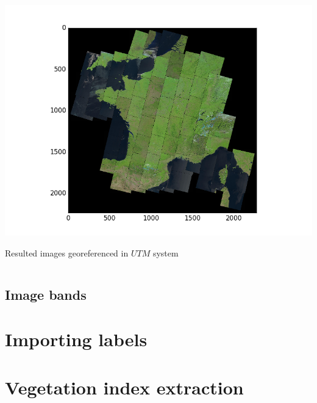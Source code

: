 \documentclass[c]{beamer}
\begin{document}
\begin{frame}
\begin{columns}[t]
\begin{column}{0.50\textwidth}
\begin{overlayarea}{\linewidth}{4cm}
  \centering\vfill
  \includegraphics[scale=0.25]{images/importing/france-covering.png}
\end{overlayarea}
\begin{overlayarea}{\linewidth}{1cm}
  \centering
  \scriptsize Resulted images georeferenced in $UTM$ system\par
\end{overlayarea}
\end{column}
\end{columns}

\end{frame}

\subsection{Image bands}
\begin{frame}
 
\end{frame}

\section{Importing labels}
\begin{frame}
 
\end{frame}

\section{Vegetation index extraction}
\end{document}
